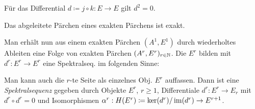 \documentclass{cheat-sheet}
\newenvironment{centertikzcd}
  {\begin{center}\begin{tikzcd}}
  {\end{tikzcd}\end{center}}
\begin{document}
\begin{bem}
  Für das Differential $d \coloneqq j \circ k : E \to E$ gilt $d^2 = 0$.
\end{bem}


\begin{lem}
  Das abgeleitete Pärchen eines exakten Pärchens ist exakt.
\end{lem}

\begin{bem}
  Man erhält nun aus einem exakten Pärchen $(A^1, E^1)$ durch wiederholtes Ableiten eine Folge von exakten Pärchen $(A^r, E^r)_{r \in \mathbb{N}}$. Die $E^r$ bilden mit $d^r \!:\! E^r \!\to\! E^r$ eine Spektralseq. im folgenden Sinne:
\end{bem}

\begin{bem}
  Man kann auch die $r$-te Seite als einzelnes Obj. $E^r$ auffassen. Dann ist eine \emph{Spektralsequenz} gegeben durch Objekte $E^r$, $r \geq 1$, Differentiale $d^r : E^r \to E_r$ mit $d^r \circ d^r = 0$ und Isomorphismen $\alpha^r : H(E^r) \coloneqq \ker(d^r) / \operatorname{im}(d^r) \to E^{r+1}$.
\end{bem}
\end{document}
